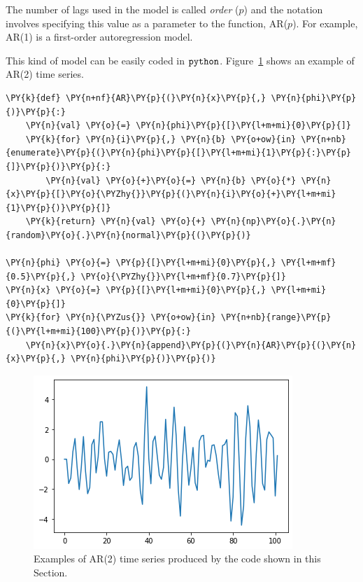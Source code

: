 The number of lags used in the model is called \emph{order} (\(p\)) 
and the  notation involves specifying this value as 
a parameter to the function, AR(\(p\)). For example,
AR(1) is a first-order autoregression model.

This kind of model can be easily coded in \(\tt{python}\). Figure~\ref{fig:ar2_example} shows an example of AR(2) time series.

\begin{codebox}[breakable, size=fbox, boxrule=1pt, pad at break*=1mm,colback=cellbackground, colframe=cellborder]
\begin{Verbatim}[commandchars=\\\{\}]
\PY{k}{def} \PY{n+nf}{AR}\PY{p}{(}\PY{n}{x}\PY{p}{,} \PY{n}{phi}\PY{p}{)}\PY{p}{:}
    \PY{n}{val} \PY{o}{=} \PY{n}{phi}\PY{p}{[}\PY{l+m+mi}{0}\PY{p}{]}
    \PY{k}{for} \PY{n}{i}\PY{p}{,} \PY{n}{b} \PY{o+ow}{in} \PY{n+nb}{enumerate}\PY{p}{(}\PY{n}{phi}\PY{p}{[}\PY{l+m+mi}{1}\PY{p}{:}\PY{p}{]}\PY{p}{)}\PY{p}{:}
        \PY{n}{val} \PY{o}{+}\PY{o}{=} \PY{n}{b} \PY{o}{*} \PY{n}{x}\PY{p}{[}\PY{o}{\PYZhy{}}\PY{p}{(}\PY{n}{i}\PY{o}{+}\PY{l+m+mi}{1}\PY{p}{)}\PY{p}{]}
    \PY{k}{return} \PY{n}{val} \PY{o}{+} \PY{n}{np}\PY{o}{.}\PY{n}{random}\PY{o}{.}\PY{n}{normal}\PY{p}{(}\PY{p}{)}

\PY{n}{phi} \PY{o}{=} \PY{p}{[}\PY{l+m+mi}{0}\PY{p}{,} \PY{l+m+mf}{0.5}\PY{p}{,} \PY{o}{\PYZhy{}}\PY{l+m+mf}{0.7}\PY{p}{]}
\PY{n}{x} \PY{o}{=} \PY{p}{[}\PY{l+m+mi}{0}\PY{p}{,} \PY{l+m+mi}{0}\PY{p}{]}
\PY{k}{for} \PY{n}{\PYZus{}} \PY{o+ow}{in} \PY{n+nb}{range}\PY{p}{(}\PY{l+m+mi}{100}\PY{p}{)}\PY{p}{:}
    \PY{n}{x}\PY{o}{.}\PY{n}{append}\PY{p}{(}\PY{n}{AR}\PY{p}{(}\PY{n}{x}\PY{p}{,} \PY{n}{phi}\PY{p}{)}\PY{p}{)}
\end{Verbatim}
\end{codebox}

\begin{figure}[htb]
	\centering
	\includegraphics[width=0.7\linewidth]{figures/ar2.png}
	\caption{Examples of AR(2) time series produced by the code shown in this Section.}
	\label{fig:ar2_example}
\end{figure}
   
